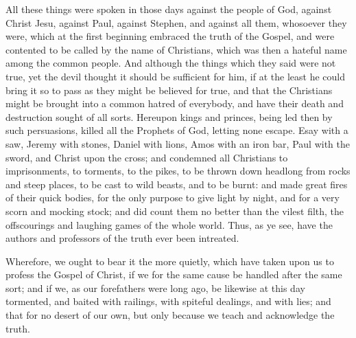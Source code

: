 All
these things were spoken in those days against the people of God, against
Christ Jesu, against Paul, against Stephen, and against all them, whosoever
they were, which at the first beginning embraced the truth of the Gospel,
and were contented to be called by the name of Christians, which was
then a hateful name among the common people. And although the
things which they said were not true, yet the devil thought it should
be sufficient for him, if at the least he could bring it so to pass
as they might be believed for true, and that the Christians might be
brought into a common hatred of everybody, and have their death and
destruction sought of all sorts. Hereupon kings and princes, being
led then by such persuasions, killed all the Prophets of God, letting
none escape. Esay with a saw, Jeremy with stones, Daniel with
lions, Amos with an iron bar, Paul with the sword, and Christ upon the
cross; and condemned all Christians to imprisonments, to torments, to
the pikes, to be thrown down headlong from rocks and steep places, to
be cast to wild beasts, and to be burnt: and made great fires of their
quick bodies, for the only purpose to give light by night, and for a
very scorn and mocking stock; and did count them no better than the
vilest filth, the offscourings and laughing games
of the whole world. Thus, as ye see, have the authors and professors
of the truth ever been intreated.

Wherefore, we ought to bear it the more quietly, which have taken
upon us to profess the Gospel of Christ, if we for the same cause be
handled after the same sort; and if we, as our forefathers were long
ago, be likewise at this day tormented, and baited with railings, with
spiteful dealings, and with lies; and that for no desert of our own,
but only because we teach and acknowledge the truth.

